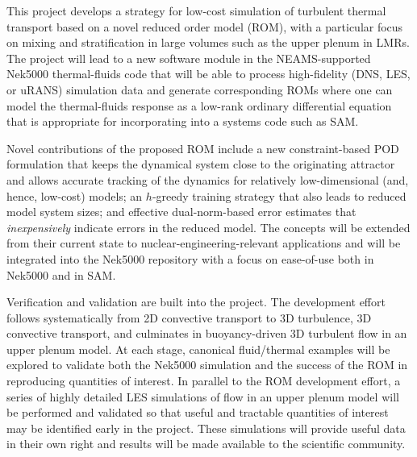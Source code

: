 This project develops a strategy for low-cost simulation of turbulent thermal
transport based on a novel reduced order model (ROM), with a particular focus
on mixing and stratification in large volumes such as the upper plenum in LMRs.
The project will lead to a new software module in the NEAMS-supported Nek5000
thermal-fluids code that will be able to process high-fidelity (DNS, LES, or
uRANS) simulation data and generate corresponding ROMs where one can model the
thermal-fluids response as a low-rank ordinary differential equation that is
appropriate for incorporating into a systems code such as SAM.

Novel contributions of the proposed ROM include a new constraint-based POD
formulation that keeps the dynamical system close to the originating attractor
and allows accurate tracking of the dynamics for relatively low-dimensional
(and, hence, low-cost) models; an $h$-greedy training strategy that also leads
to reduced model system sizes; and effective dual-norm-based error estimates
that {\em inexpensively} indicate errors in the reduced model.  The concepts
will be extended from their current state to nuclear-engineering-relevant
applications and will be integrated into the Nek5000 repository with a focus
on ease-of-use both in Nek5000 and in SAM.

Verification and validation are built into the project.  The development effort
follows systematically from 2D convective transport to 3D turbulence, 3D
convective transport, and culminates in buoyancy-driven 3D turbulent flow in an
upper plenum model.  At each stage, canonical fluid/thermal examples will be
explored to validate both the Nek5000 simulation and the success of the ROM in
reproducing quantities of interest.
   In parallel to the ROM development effort, a series of highly detailed LES 
simulations of flow in an upper plenum model will be performed and validated
so that useful and tractable quantities of interest may be identified early
in the project.   These simulations will provide useful data in their
own right and results will be made available to the scientific community.

